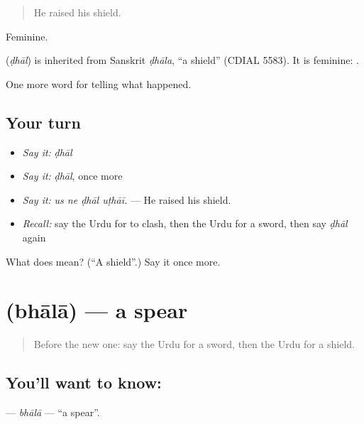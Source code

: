 \begin{quote}
He raised his shield.
\end{quote}

Feminine.

\begin{cousinweb}
\textbf{} (\emph{ḍhāl}) is inherited from Sanskrit \emph{ḍhāla}, \textquotedblleft{}a shield\textquotedblright{} (CDIAL 5583). It is feminine: \textbf{ }.
\end{cousinweb}

\begin{grammarlens}[title={What you've built}]
One more word for telling what happened.
\end{grammarlens}

\subsection*{Your turn}
\begin{itemize}
\raggedright
  \item \emph{Say it:} \emph{ḍhāl}
  \item \emph{Say it:} \emph{ḍhāl}, once more
  \item \emph{Say it:} \emph{us ne ḍhāl uṭhāī.} — He raised his shield.
  \item \emph{Recall:} say the Urdu for to clash, then the Urdu for a sword, then say \emph{ḍhāl} again
\end{itemize}

\begin{tcolorbox}[breakable,colback=teal!4,colframe=teal!35!black,title={Before you move on}]
What does  mean? (\textquotedblleft{}A shield\textquotedblright{}.) Say it once more.
\end{tcolorbox}
\section[\texorpdfstring{\ur{بھالا} (bhālā)}{بھالا (bhālā)}]{ (bhālā) — a spear}

\label{lesson:UR-C310-bhala}



\begin{quote}
Before the new one: say the Urdu for a sword, then the Urdu for a shield.
\end{quote}

\subsection*{You'll want to know: }
\textbf{} — \emph{bhālā} — \textquotedblleft{}a spear\textquotedblright{}.

